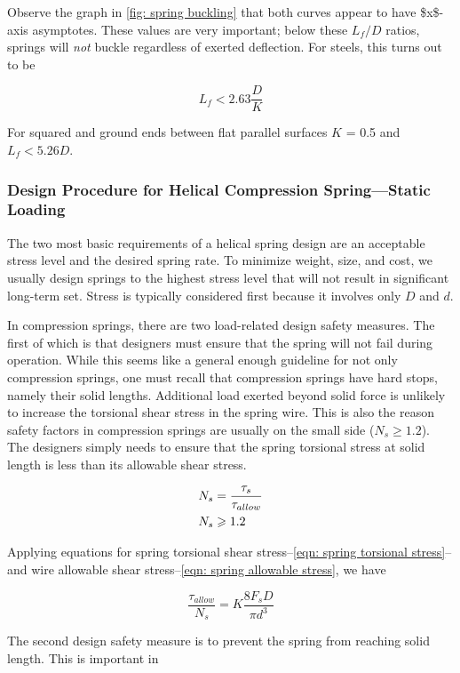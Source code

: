 \documentclass[a4paper,openany,nobib]{tufte-book}
\begin{document}
{{Observe the graph in \ref{fig: spring buckling}
that both curves appear to have \$x\$-axis asymptotes. These values are
very important; below these \(L_f/D\) ratios, springs will \emph{not} buckle
regardless of exerted deflection. For steels, this turns out to be

$$L_f < 2.63 \frac{D}{K}$$

For squared and ground ends between flat parallel surfaces \(K\) = 0.5 and
\(L_f < 5.26 D\).

\subsubsection{Design Procedure for Helical Compression Spring---Static Loading}
\label{design-procedure-for-helical-compression-springstatic-loading}
The two most basic requirements of a helical spring design are an
acceptable stress level and the desired spring rate. To minimize weight,
size, and cost, we usually design springs to the highest stress level
that will not result in significant long-term set. Stress is typically
considered first because it involves only \(D\) and \(d\).

In compression springs, there are two load-related design safety
measures. The first of which is that designers must ensure that the
spring will not fail during operation. While this seems like a general
enough guideline for not only compression springs, one must recall that
compression springs have hard stops, namely their solid lengths.
Additional load exerted beyond solid force is unlikely to increase the
torsional shear stress in the spring wire. This is also the reason
safety factors in compression springs are usually on the small side
(\(N_s \geq 1.2\)). The designers simply needs to ensure that the spring
torsional stress at solid length is less than its allowable shear
stress.

\begin{gather}
\label{eqn: spring allowable stress}
  N_s = \frac{\tau _s}{\tau _{allow}} \hfill \\
  N_s \geqslant 1.2 \hfill \\ 
\end{gather}

Applying equations for spring torsional shear
stress--\ref{eqn: spring torsional stress}--and
wire allowable shear
stress--\ref{eqn: spring allowable stress},
we have

$$\frac{\tau _{allow}}{N_s} = K\frac{8F_sD}{\pi d^3}$$

The second design safety measure is to prevent the spring from reaching
solid length. This is important in

}}
\end{document}
